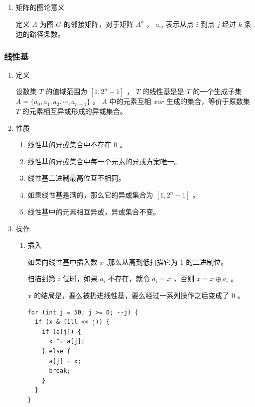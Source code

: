 \documentclass[11pt]{article}
\begin{document}
\begin{enumerate}
\item 矩阵的图论意义
\label{sec-3-1-1-1}

定义 $A$ 为图 $G$ 的邻接矩阵，对于矩阵 $A^k$ ， $a_{ij}$ 表示从点 $i$ 到点 $j$ 经过 $k$ 条边的路径条数。
\end{enumerate}
\subsubsection{线性基}
\label{sec-3-1-2}

\begin{enumerate}
\item 定义
\label{sec-3-1-2-1}

设数集 $T$ 的值域范围为 $[1,2^n-1]$ ， $T$ 的线性基是是 $T$ 的一个生成子集 $A=\{a_0,a_1,a_2,\cdots,a_{n-1}\}$ 。 $A$ 中的元素互相 $xor$ 生成的集合，等价于原数集 $T$ 的元素相互异或形成的异或集合。

\item 性质
\label{sec-3-1-2-2}

\begin{enumerate}
\item 线性基的异或集合中不存在 $0$ 。
\item 线性基的异或集合中每一个元素的异或方案唯一。
\item 线性基二进制最高位互不相同。
\item 如果线性基是满的，那么它的异或集合为 $[1,2^n-1]$ 。
\item 线性基中的元素相互异或，异或集合不变。
\end{enumerate}

\item 操作
\label{sec-3-1-2-3}

\begin{enumerate}
\item 插入
\label{sec-3-1-2-3-1}

如果向线性基中插入数 $x$ ,那么从高到低扫描它为 $1$ 的二进制位。

扫描到第 $i$ 位时，如果 $a_i$ 不存在，就令 $a_i=x$ ，否则 $x=x \oplus a_i$ 。

$x$ 的结局是，要么被扔进线性基，要么经过一系列操作之后变成了 $0$ 。

\begin{verbatim}
for (int j = 50; j >= 0; --j) {
  if (x & (1ll << j)) {
    if (a[j]) {
      x ^= a[j];
    } else {
      a[j] = x;
      break;
    }
  }
}
\end{verbatim}


\end{enumerate}
\end{enumerate}
\end{document}
